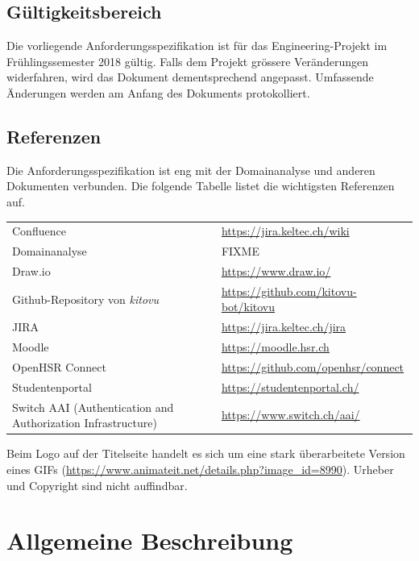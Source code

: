 \documentclass[a4paper]{article}
\let\oldsection\section
\renewcommand\section{\clearpage\oldsection}
\def\jiraurl{https://jira.keltec.ch/jira}
\def\confluenceurl{https://jira.keltec.ch/wiki}
\begin{document}
\subsection{Gültigkeitsbereich}
Die vorliegende Anforderungsspezifikation ist für das Engineering-Projekt im Frühlingssemester 2018 gültig. Falls dem Projekt grössere Veränderungen widerfahren, wird das Dokument dementsprechend angepasst. Umfassende Änderungen werden am Anfang des Dokuments protokolliert.

\subsection{Referenzen}


Die Anforderungsspezifikation ist eng mit der Domainanalyse und anderen Dokumenten verbunden. Die folgende Tabelle listet die wichtigsten Referenzen auf.

\begin{tabulary}{\linewidth}{ll}
	Confluence & \url{\confluenceurl} \\
	Domainanalyse & FIXME \\
	Draw.io & \url{https://www.draw.io/} \\
	Github-Repository von \emph{kitovu} & \url{https://github.com/kitovu-bot/kitovu} \\
	JIRA	& \url{\jiraurl} \\
	Moodle & \url{https://moodle.hsr.ch} \\
	OpenHSR Connect & \url{https://github.com/openhsr/connect} \\
	Studentenportal & \url{https://studentenportal.ch/} \\
	Switch AAI (Authentication and Authorization Infrastructure)& \url{https://www.switch.ch/aai/} \\
	
\end{tabulary}

Beim Logo auf der Titelseite handelt es sich um eine stark überarbeitete Version eines GIFs (\url{https://www.animateit.net/details.php?image_id=8990}). Urheber und Copyright sind nicht auffindbar.

\pagebreak
\section{Allgemeine Beschreibung}
\end{document}
